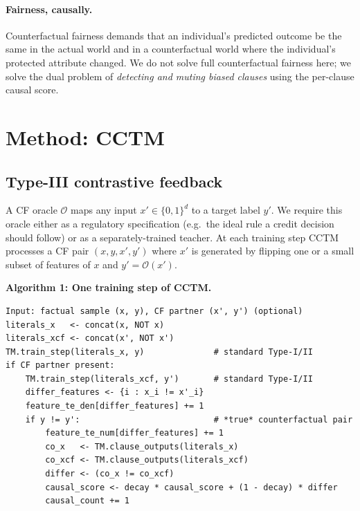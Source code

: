\documentclass[11pt]{article}
\begin{document}
\paragraph{Fairness, causally.}  Counterfactual fairness \citep{kusner2017counterfactual} demands that an individual's predicted outcome be the same in the actual world and in a counterfactual world where the individual's protected attribute changed.  We do not solve full counterfactual fairness here; we solve the dual problem of \emph{detecting and muting biased clauses} using the per-clause causal score.

\section{Method: CCTM}

\subsection{Type-III contrastive feedback}

A CF oracle $\mathcal{O}$ maps any input $x' \in \{0, 1\}^d$ to a target label $y'$.  We require this oracle either as a regulatory specification (e.g.\ the ideal rule a credit decision should follow) or as a separately-trained teacher.  At each training step CCTM processes a CF pair $(x, y, x', y')$ where $x'$ is generated by flipping one or a small subset of features of $x$ and $y' = \mathcal{O}(x')$.

\begin{algorithm}
\noindent\hrulefill\par
\textbf{Algorithm 1: One training step of CCTM.}\\[2pt]
\noindent\hrulefill
\begin{verbatim}
Input: factual sample (x, y), CF partner (x', y') (optional)
literals_x   <- concat(x, NOT x)
literals_xcf <- concat(x', NOT x')
TM.train_step(literals_x, y)              # standard Type-I/II
if CF partner present:
    TM.train_step(literals_xcf, y')       # standard Type-I/II
    differ_features <- {i : x_i != x'_i}
    feature_te_den[differ_features] += 1
    if y != y':                           # *true* counterfactual pair
        feature_te_num[differ_features] += 1
        co_x   <- TM.clause_outputs(literals_x)
        co_xcf <- TM.clause_outputs(literals_xcf)
        differ <- (co_x != co_xcf)
        causal_score <- decay * causal_score + (1 - decay) * differ
        causal_count += 1
\end{verbatim}
\noindent\hrulefill
\label{alg:cctm-train}
\end{algorithm}
\end{document}
